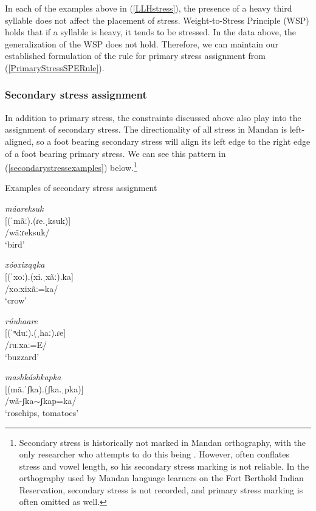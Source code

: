 In each of the examples above in (\ref{LLHstress}), the presence of a heavy third syllable does not affect the placement of stress.  Weight-to-Stress Principle (WSP) holds that if a syllable is heavy, it tends to be stressed. In the data above, the generalization of the WSP does not hold. Therefore, we can maintain our established formulation of the rule for primary stress assignment from (\ref{PrimaryStressSPERule}).

\subsubsection{Secondary stress assignment}\label{secondarystress}

In addition to primary stress, the constraints discussed above also play into the assignment of secondary stress. The directionality of all stress in Mandan is left-aligned, so a foot bearing secondary stress will align its left edge to the right edge of a foot bearing primary stress. We can see this pattern in (\ref{secondarystressexamples}) below.\footnote{Secondary stress is historically not marked in Mandan orthography, with the only researcher who attempts to do this being \citet{kennard1936}. However, \citeauthor{kennard1936} often conflates stress and vowel length, so his secondary stress marking is not reliable. In the orthography used by Mandan language learners on the Fort Berthold Indian Reservation, secondary stress is not recorded, and primary stress marking is often omitted as well.}

\begin{exe}
\item\label{secondarystressexamples} Examples of secondary stress assignment

\begin{xlist}
\item 	\textit{máareksuk}\\
    {[}(ˈmãː).(ɾe.ˌksuk)]\\
    /wãːɾeksuk/\\
    `bird'

\item 	\textit{xóoxixąąka}\\
    {[}(ˈxoː).(xi.ˌxãː).ka]\\
    /xoːxixãː=ka/\\
    `crow'

\item 	\textit{rúuhaare}\\
	{[}(ˈⁿduː).(ˌhaː).ɾe]\\
        /ɾuːxaː=E/\\
	`buzzard'

\item   \textit{mashkáshkapka}\\
	{[}(mã.ˈʃka).(ʃka.ˌpka)]\\
        /wã-ʃka$\sim$ʃkap=ka/\\
	`rosehips, tomatoes'
\end{xlist}

\end{exe}

